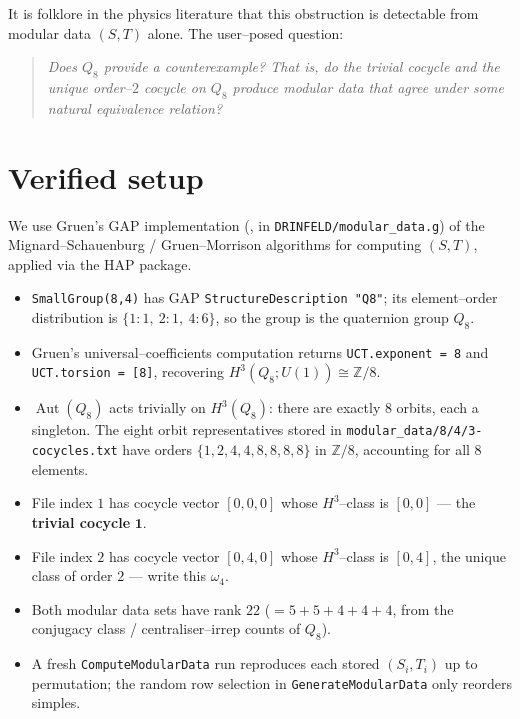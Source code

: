 \documentclass[11pt,a4paper]{amsart}
\theoremstyle{plain}
\theoremstyle{definition}
\DeclareMathOperator{\Aut}{Aut}
\newcommand{\trivcoc}{\mathbf{1}}
\begin{document}
It is folklore in the physics literature that this obstruction is
detectable from modular data $(S,T)$ alone. The user--posed question:

\begin{quote}
  \emph{Does $Q_8$ provide a counterexample? That is, do the trivial
  cocycle and the unique order--$2$ cocycle on $Q_8$ produce
  modular data that agree under some natural equivalence relation?}
\end{quote}

\section{Verified setup}

We use Gruen's GAP implementation (\cite{Gruen}, in
\verb|DRINFELD/modular_data.g|) of the Mignard--Schauenburg /
Gruen--Morrison algorithms for computing $(S,T)$, applied via the
\textsf{HAP} package.

\begin{itemize}
\item \verb|SmallGroup(8,4)| has GAP \verb|StructureDescription "Q8"|;
      its element--order distribution is $\{1\colon 1,\ 2\colon 1,\ 4\colon 6\}$,
      so the group is the quaternion group $Q_8$.
\item Gruen's universal--coefficients computation returns
      \verb|UCT.exponent = 8| and \verb|UCT.torsion = [8]|, recovering
      $H^3(Q_8;U(1))\cong\mathbb Z/8$.
\item $\Aut(Q_8)$ acts trivially on $H^3(Q_8)$: there are exactly $8$
      orbits, each a singleton. The eight orbit representatives stored in
      \verb|modular_data/8/4/3-cocycles.txt| have orders
      $\{1, 2, 4, 4, 8, 8, 8, 8\}$ in $\mathbb Z/8$, accounting for all
      $8$ elements.
\item File index $1$ has cocycle vector $[0,0,0]$ whose
      $H^3$--class is $[0,0]$ --- the \textbf{trivial cocycle} $\trivcoc$.
\item File index $2$ has cocycle vector $[0,4,0]$ whose $H^3$--class
      is $[0,4]$, the unique class of order $2$ --- write this
      $\omega_4$.
\item Both modular data sets have rank $22$ ($=5+5+4+4+4$, from the
      conjugacy class / centraliser--irrep counts of $Q_8$).
\item A fresh \texttt{ComputeModularData} run reproduces each stored
      $(S_i,T_i)$ up to permutation; the random row selection in
      \texttt{GenerateModularData} only reorders simples.
\end{itemize}
\end{document}
